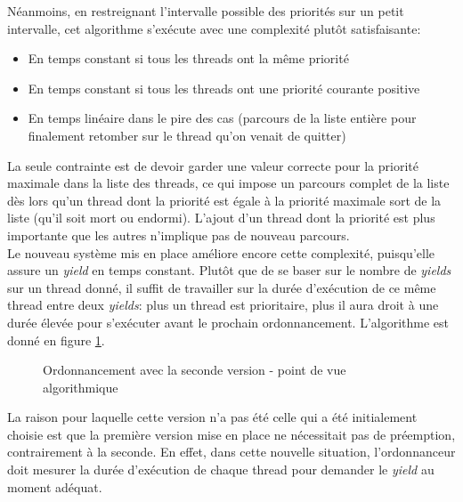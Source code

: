 \documentclass[a4paper,11pt]{article}
\begin{document}
Néanmoins, en restreignant l'intervalle possible des priorités sur un petit intervalle, cet algorithme s'exécute avec une complexité plutôt satisfaisante:
\begin{itemize}
 \item En temps constant si tous les threads ont la même priorité
 \item En temps constant si tous les threads ont une priorité courante positive
 \item En temps linéaire dans le pire des cas (parcours de la liste entière pour finalement retomber sur le thread qu'on venait de quitter)
\end{itemize}

La seule contrainte est de devoir garder une valeur correcte pour la priorité maximale dans la liste des threads, ce qui impose un parcours complet de la liste dès lors qu'un thread dont la priorité est égale à la priorité maximale sort de la liste (qu'il soit mort ou endormi). L'ajout d'un thread dont la priorité est plus importante que les autres n'implique pas de nouveau parcours.\\

Le nouveau système mis en place améliore encore cette complexité, puisqu'elle assure un \textit{yield} en temps constant. Plutôt que de se baser sur le nombre de \textit{yields} sur un thread donné, il suffit de travailler sur la durée d'exécution de ce même thread entre deux \textit{yields}: plus un thread est prioritaire, plus il aura droit à une durée élevée pour s'exécuter avant le prochain ordonnancement. L'algorithme est donné en figure \ref{priority2}.

\begin{figure}[H]
\begin{algorithm}[H]
\end{algorithm}
\caption{Ordonnancement avec la seconde version - point de vue algorithmique}
\label{priority2}
\end{figure}

La raison pour laquelle cette version n'a pas été celle qui a été initialement choisie est que la première version mise en place ne nécessitait pas de préemption, contrairement à la seconde. En effet, dans cette nouvelle situation, l'ordonnanceur doit mesurer la durée d'exécution de chaque thread pour demander le \textit{yield} au moment adéquat.
\end{document}
